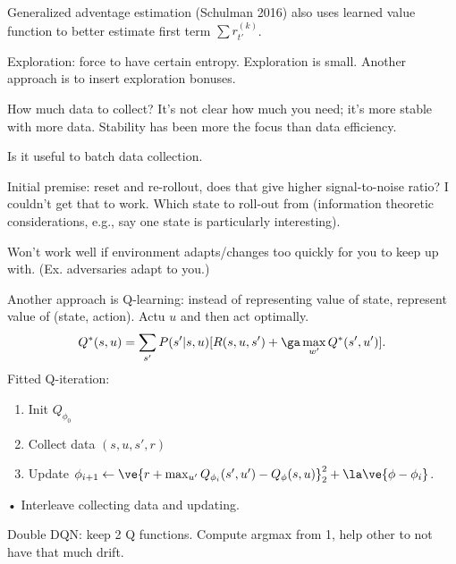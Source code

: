 Generalized adventage estimation (Schulman 2016) also uses learned value function to better estimate first term $\sum r_{t'}^{(k)}$. 


Exploration: force to have certain entropy. Exploration is small. Another approach is to insert exploration bonuses.


How much data to collect? It's not clear how much you need; it's more stable with more data. Stability has been more the focus than data efficiency.

Is it useful to batch data collection.

Initial premise: reset and re-rollout, does that give higher signal-to-noise ratio? I couldn't get that to work. Which state to roll-out from (information theoretic considerations, e.g., say one state is particularly interesting).


Won't work well if environment adapts/changes too quickly for you to keep up with. (Ex. adversaries adapt to you.)

Another approach is Q-learning: instead of representing value of state, represent value of (state, action).  Actu $u$ and then act optimally.
$$
Q^*(s,u) = \sum_{s'} P(s'|s,u) [R(s,u,s') +\ga \max_{w'} Q^*(s',u')].
$$
Fitted Q-iteration:
\begin{enumerate}
\item
Init $Q_{\phi_0}$
\item
Collect data $(s,u,s',r)$
\item
Update $\phi_{i+1} \leftarrow \ve{r+\max_{u'} Q_{\phi_i}(s',u') - Q_\phi(s,u)}_2^2 + \la\ve{\phi-\phi_i}$.
\end{enumerate}•
Interleave collecting data and updating.


Double DQN: keep 2 Q functions. Compute argmax from 1, help other to not have that much drift. 

